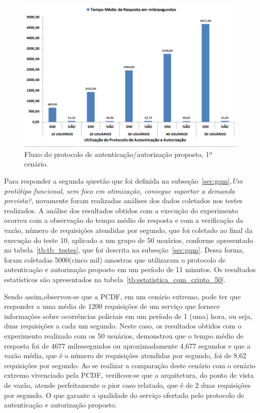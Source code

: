 \begin{figure}[!htb]
    \centering
    \includegraphics[width=1.0\textwidth]{grafico_teste_desempenho.png}
    \caption{Fluxo do protocolo de autenticação/autorização proposto, 1º cenário.}
    \label{fig:grafico_teste_desempenho}
\end{figure}

Para responder a segunda questão que foi definida na subseção~\ref{sec:gqm},\emph{Um protótipo funcional, sem foco em otimização, consegue suportar a demanda prevista?}, novamente foram realizadas análises dos dados coletados nos testes realizados. A análise dos resultados obtidos com a execução do experimento ocorreu com a observação do tempo médio de resposta e com a verificação da vazão, número de requisições atendidas por segundo, que foi coletado ao final da execução do teste 10, aplicado a um grupo de 50 usuários, conforme apresentado na tabela~\ref{tb:tb_testes}, que foi descrita na subseção~\ref{sec:gqm}. Dessa forma, foram coletadas 5000(cinco mil) amostras que utilizaram o protocolo de autenticação e autorização proposto em um período de 11 minutos. Os resultados estatísticos são apresentados na tabela~\ref{tb:estatistica_com_cripto_50}.

Sendo assim,observou-se que a PCDF, em um cenário extremo, pode ter que responder a uma média de 1200 requisições de um serviço que fornece informações sobre ocorrências policiais em um período de 1 (uma) hora, ou seja, duas requisições a cada um segundo. Neste caso, os resultados obtidos com o experimento realizado com os 50 usuários, demonstrou que o tempo médio de resposta foi de 4677 milessegundos ou aproximadamente 4,677 segundos e que a vazão média, que é o número de requisições atendidas por segundo, foi de 8,62 requisições por segundo. Ao se realizar a comparação deste cenário com o cenário extremo vivenciado pela PCDF, verificou-se que a arquitetura, do ponto de vista de vazão, atende perfeitamente o pior caso relatado, que é de 2 duas requisições por segundo. O que garante a qualidade do serviço ofertado pelo protocolo de autenticação e autorização proposto.


